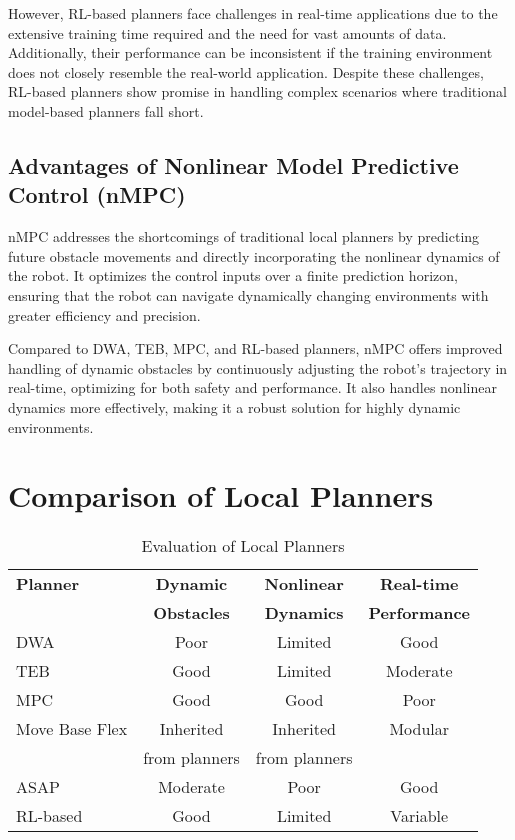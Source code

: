 \documentclass[conference]{IEEEtran}
\begin{document}
However, RL-based planners face challenges in real-time applications due to the extensive training time required and the need for vast amounts of data. Additionally, their performance can be inconsistent if the training environment does not closely resemble the real-world application. Despite these challenges, RL-based planners show promise in handling complex scenarios where traditional model-based planners fall short.

\subsection{Advantages of Nonlinear Model Predictive Control (nMPC)}
nMPC addresses the shortcomings of traditional local planners by predicting future obstacle movements and directly incorporating the nonlinear dynamics of the robot. It optimizes the control inputs over a finite prediction horizon, ensuring that the robot can navigate dynamically changing environments with greater efficiency and precision.

Compared to DWA, TEB, MPC, and RL-based planners, nMPC offers improved handling of dynamic obstacles by continuously adjusting the robot's trajectory in real-time, optimizing for both safety and performance. It also handles nonlinear dynamics more effectively, making it a robust solution for highly dynamic environments.

\section{Comparison of Local Planners}

\begin{table}[h]
\centering
\caption{Evaluation of Local Planners}
\begin{tabular}{|l|c|c|c|}
\hline
\textbf{Planner} & \textbf{Dynamic} & \textbf{Nonlinear} & \textbf{Real-time} \\
                 & \textbf{Obstacles} & \textbf{Dynamics}  & \textbf{Performance} \\ \hline
DWA              & Poor               & Limited            & Good                \\ \hline
TEB              & Good               & Limited            & Moderate            \\ \hline
MPC              & Good               & Good               & Poor                \\ \hline
Move Base Flex   & Inherited          & Inherited          & Modular             \\
                 & from planners      & from planners      &                     \\ \hline
ASAP             & Moderate           & Poor               & Good                \\ \hline
RL-based         & Good               & Limited            & Variable            \\ \hline
\end{tabular}
\end{table}
\end{document}
